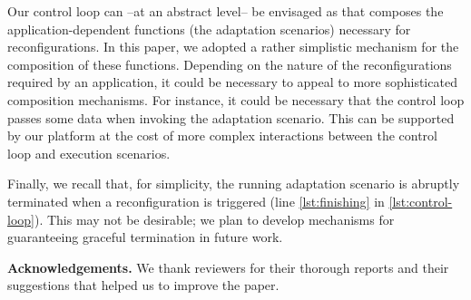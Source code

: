 Our control loop can --at an abstract
level-- be envisaged as  that composes the
application-dependent functions (the adaptation scenarios) necessary
for reconfigurations.
%
In this paper, we adopted a rather simplistic mechanism for the
composition of these functions.
%
Depending on the nature of the reconfigurations required by an
application, it could be necessary to appeal to more sophisticated 
composition mechanisms.
%
For instance, it could be necessary that the control loop passes
some data when invoking the adaptation scenario.
%
This can be supported by our platform at the cost of
more complex interactions between the control loop and execution
scenarios.

Finally, we recall that, for simplicity, the running adaptation
scenario is abruptly terminated when a reconfiguration is triggered
(line \ref{lst:finishing} in \cref{lst:control-loop}).
%
This may not be desirable; we plan to develop mechanisms for
guaranteeing graceful termination in future work.

\medskip

\noindent\textbf{Acknowledgements.}
We thank reviewers for their thorough reports and their suggestions that helped us to improve the paper.




